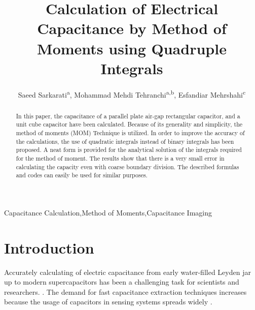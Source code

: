 \documentclass[final,5p,times,twocolumn]{elsarticle}
\begin{document}
\begin{frontmatter}

\title{Calculation of Electrical Capacitance by  Method of Moments using Quadruple Integrals}


\author{Saeed Sarkarati\textsuperscript{a}, Mohammad Mehdi Tehranchi\textsuperscript{a,b}, Esfandiar Mehrshahi\textsuperscript{c}}
\address{\textsuperscript{a}Laser and Plasma Research Institute, Shahid Beheshti University, Tehran, Iran}
\address{\textsuperscript{b}Department of Physics , Shahid Beheshti University, Tehran, Iran}
\address{\textsuperscript{c}Department of Electrical Engineering, Shahid Beheshti University, Tehran, Iran}



\begin{abstract}
In this paper, the capacitance of a parallel plate air-gap rectangular capacitor, and a unit cube capacitor have been calculated. Because of its generality and simplicity, the method of moments (MOM) Technique is utilized. In order to improve the accuracy of the calculations, the use of quadratic integrals instead of binary integrals has been proposed. A neat form is provided for the analytical solution of the integrals required for the method of moment. The results show that there is a very small error in calculating the capacity even with coarse boundary division. The described formulas and codes can easily be used for similar purposes.
\end{abstract}

\begin{keyword}
Capacitance Calculation\sep Method of Moments\sep Capacitance Imaging

\end{keyword}

\end{frontmatter}

\linenumbers

\section{Introduction}

Accurately calculating of electric capacitance from early water-filled Leyden jar up to modern supercapacitors has been a challenging task for scientists and researchers. \cite{Dubal2016}. The demand for fast capacitance extraction techniques increases because the usage of capacitors in sensing systems spreads widely \cite{Rahman2009}.
\end{document}

